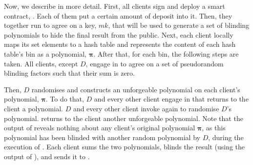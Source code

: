 



%


%
%


Now, we describe \fpsi in more detail. First, all clients sign and deploy a  smart contract, \scf. Each of them put a certain amount of deposit into it. Then, they together run \ct to agree on a key, $mk$, that will be used to generate a set of blinding polynomials to hide the final result from the public. Next, each client locally maps its set elements to a hash table and represents the content of each hash table's bin as a polynomial, $\bm\pi$. After that, for each bin, the following steps are taken.  All clients, except $D$, engage in \zspaa to agree on a set of pseudorandom blinding factors such that their sum is zero.  %

Then, $D$ randomises and constructs an unforgeable polynomial on each client's polynomial, $\bm\pi$. To do that, $D$ and every other client engage in \vopr that returns to the client a polynomial. $D$ and every other client invoke \vopr again to randomise $D$'s polynomial. \vopr returns to the client another unforgeable polynomial. Note that the output of \vopr reveals nothing about any client's original polynomial $\bm\pi$, as this polynomial has been blinded with another random polynomial by $D$, during the execution of \vopr. Each client sums the two polynomials,  blinds the result (using the output of  \zspaa), and sends it to \scf. 



